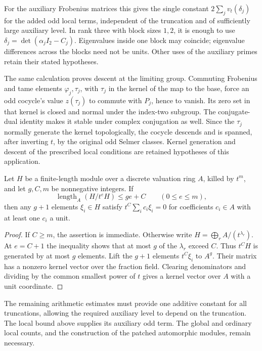 For the auxiliary Frobenius matrices this gives the single constant
$2\sum_jv_t(\delta_j)$ for the added odd local terms, independent of
the truncation and of sufficiently large auxiliary level. In rank
three with block sizes $1,2$, it is enough to use
$\delta_j=\det(\alpha_jI_2-C_j)$. Eigenvalues inside one block may
coincide; eigenvalue differences across the blocks need not be units.
Other uses of the auxiliary primes retain their stated hypotheses.

The same calculation proves descent at the limiting group. Commuting
Frobenius and tame elements $\varphi_j,\tau_j$, with $\tau_j$ in the
kernel of the map to the base, force an odd cocycle's value
$z(\tau_j)$ to commute with $P_j$, hence to vanish. Its zero set
in that kernel is closed and normal under the index-two subgroup.
The conjugate-dual identity makes it stable under complex conjugation
as well. Since the $\tau_j$ normally generate the kernel topologically,
the cocycle descends and is spanned, after inverting $t$, by the original
odd Selmer classes. Kernel generation and descent of the prescribed
local conditions are retained hypotheses of this application.

\begin{lemma}
\label{lem:selmer-finite-obstruction}
Let $H$ be a finite-length module over a discrete valuation ring $A$,
killed by $t^m$, and let $g,C,m$ be nonnegative integers. If
\[
          \operatorname{length}_A(H/t^eH)\leq ge+C
          \qquad(0\leq e\leq m),
\]
then any $g+1$ elements $\xi_i\in H$ satisfy
$t^C\sum_i c_i\xi_i=0$ for coefficients $c_i\in A$ with at least
one $c_i$ a unit.
\end{lemma}

\begin{proof}
If $C\geq m$, the assertion is immediate. Otherwise write
$H=\bigoplus_r A/(t^{\lambda_r})$. At $e=C+1$ the inequality shows
that at most $g$ of the $\lambda_r$ exceed $C$. Thus $t^CH$ is
generated by at most $g$ elements. Lift the $g+1$ elements $t^C\xi_i$
to $A^g$. Their matrix has a nonzero kernel vector over the fraction
field. Clearing denominators and dividing by the common smallest power
of $t$ gives a kernel vector over $A$ with a unit coordinate.
\end{proof}

The remaining arithmetic estimates must provide one additive constant
for all truncations, allowing the required auxiliary level to depend
on the truncation. The local bound above supplies its auxiliary odd
term. The global and ordinary local counts, and the construction of
the patched automorphic modules, remain necessary.
